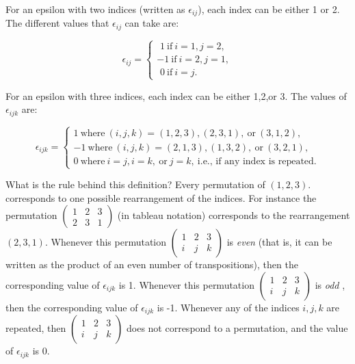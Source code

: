 For an epsilon with two indices (written as $\epsilon_{ij}$), each index can be either 1 or 2. The different values that $\epsilon_{ij}$ can take are:

\[ \epsilon_{ij}=
\begin{cases}
\,\,1 ~ \text{if} ~ i=1, j=2,  \\
-1 ~ \text{if} ~ i=2, j=1,  \\
\,\, 0 ~ \text{if} ~ i=j.
\end{cases} \]

For an epsilon with three indices, each index can be either 1,2,or 3. The values of $\epsilon_{ijk}$ are:

\[ \epsilon_{ijk}=
\begin{cases}
1 ~ \text{where} ~ (i,j,k)= (1,2,3),  (2,3,1),  \mathrm{~or~}(3,1,2), \\
-1 ~ \text{where} ~ (i,j,k) = (2,1,3), (1,3,2),  \mathrm{~or~}(3,2,1),  \\
0 ~ \text{where} ~  i=j, i=k, ~ \text{or} ~ j=k, ~ \text{i.e., if any index is repeated.}
\end{cases} \]

What is the rule behind this definition?  Every permutation of $(1,2,3)$.  corresponds to one possible rearrangement of the indices. For instance the permutation 
$ \left( \begin{smallmatrix}  1 & 2 & 3  \\ 2 & 3 & 1  \end{smallmatrix} \right)$ (in tableau notation) corresponds to the rearrangement $(2,3,1)$.  Whenever this permutation $\left( \begin{smallmatrix} 1 & 2 & 3  \\ i & j & k  \end{smallmatrix} \right) $ is \emph{even} (that is, it can be written as the product of an even number of transpositions), then the corresponding value of $\epsilon_{ijk}$ is 1. Whenever this permutation $\left( \begin{smallmatrix} 1 & 2 & 3  \\ i & j & k  \end{smallmatrix} \right)$ is \emph{odd} , then the corresponding value of $\epsilon_{ijk}$ is -1. Whenever any of the indices $i,j,k$  are repeated, then  $\left( \begin{smallmatrix} 1 & 2 & 3  \\ i & j & k  \end{smallmatrix} \right) $ does not correspond to a permutation, and the value of $\epsilon_{ijk}$ is 0.

